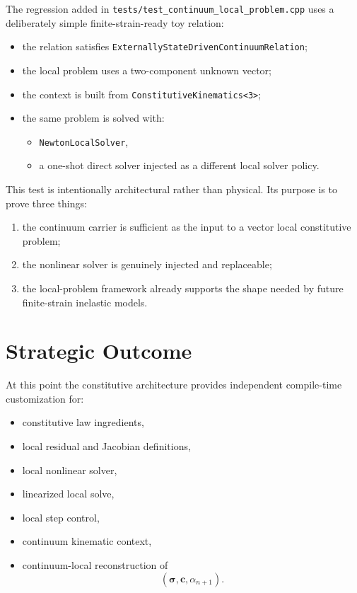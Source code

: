 The regression added in
\texttt{tests/test\_continuum\_local\_problem.cpp}
uses a deliberately simple finite-strain-ready toy relation:
\begin{itemize}
  \item the relation satisfies
        \texttt{ExternallyStateDrivenContinuumRelation};
  \item the local problem uses a two-component unknown vector;
  \item the context is built from
        \texttt{ConstitutiveKinematics<3>};
  \item the same problem is solved with:
        \begin{itemize}
          \item \texttt{NewtonLocalSolver},
          \item a one-shot direct solver injected as a different local solver
                policy.
        \end{itemize}
\end{itemize}

This test is intentionally architectural rather than physical.  Its purpose is
to prove three things:
\begin{enumerate}
  \item the continuum carrier is sufficient as the input to a vector local
        constitutive problem;
  \item the nonlinear solver is genuinely injected and replaceable;
  \item the local-problem framework already supports the shape needed by future
        finite-strain inelastic models.
\end{enumerate}

\section{Strategic Outcome}

At this point the constitutive architecture provides independent compile-time
customization for:
\begin{itemize}
  \item constitutive law ingredients,
  \item local residual and Jacobian definitions,
  \item local nonlinear solver,
  \item linearized local solve,
  \item local step control,
  \item continuum kinematic context,
  \item continuum-local reconstruction of
        \[
          (\boldsymbol{\sigma}, \mathbf{c}, \alpha_{n+1}).
        \]
\end{itemize}


